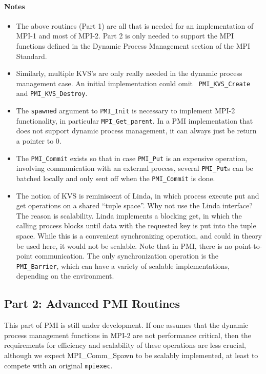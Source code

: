 \documentclass[11pt]{article}
\begin{document}
\paragraph{Notes}
\begin{itemize}
\item The above routines (Part 1) are all that is needed for an
  implementation of MPI-1 and most of MPI-2.  Part 2 is only needed to
  support the MPI functions defined in the Dynamic Process Management
  section of the MPI Standard.
\item Similarly, multiple KVS's are only really needed in the dynamic
  process management case.  An initial implementation could omit {\tt
    PMI\_KVS\_Create} and {\tt PMI\_KVS\_Destroy}.
\item The {\tt spawned} argument to {\tt PMI\_Init} is necessary to
  implement MPI-2 functionality, in particular {\tt MPI\_Get\_parent}.
  In a PMI implementation that does not support dynamic process
  management, it can always just be return a pointer to 0.
\item The {\tt PMI\_Commit} exists so that in case {\tt PMI\_Put} is an
  expensive operation, involving communication with an external process,
  several {\tt PMI\_Put}s can be batched locally and only sent off when
  the {\tt PMI\_Commit} is done.
\item The notion of KVS is reminiscent of Linda, in which process
  execute put and get operations on a shared ``tuple space''.  Why not
  use the Linda interface?  The reason is scalability.  Linda implements
  a blocking get, in which the calling process blocks until data with
  the requested key is put into the tuple space.  While this is a
  convenient synchronizing operation, and could in theory be
  used here, it would not be scalable.  Note that in PMI, there is no
  point-to-point communication.  The only synchronization operation is
  the {\tt PMI\_Barrier}, which can have a variety of scalable
  implementations, depending on the environment.
\end{itemize}

\subsection{Part 2:  Advanced PMI Routines}
\label{sec:part2}

This part of PMI is still under development.  If one assumes that the
dynamic process management functions in MPI-2 are not performance
critical, then the requirements for efficiency and scalability of these
operations are less crucial, although we expect MPI\_Comm\_Spawn to be
scalably implemented, at least to compete with an original {\tt mpiexec}.
\end{document}
